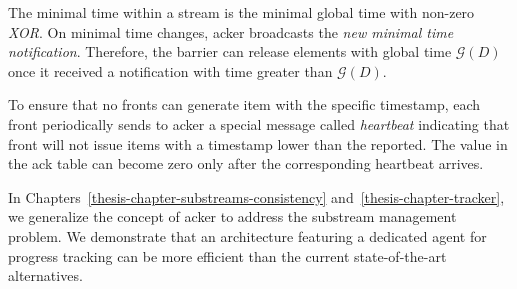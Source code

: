 The minimal time within a stream is the minimal global time with non-zero {\it XOR}. On minimal time changes, acker broadcasts the {\it new minimal time notification}. Therefore, the barrier can release elements with global time $\mathcal{G} (D)$ once it received a notification with time greater than $\mathcal{G} (D)$.

To ensure that no fronts can generate item with the specific timestamp, each front periodically sends to acker a special message called {\it heartbeat} indicating that front will not issue items with a timestamp lower than the reported. The value in the ack table can become zero only after the corresponding heartbeat arrives.

In Chapters~\ref{thesis-chapter-substreams-consistency} and~\ref{thesis-chapter-tracker}, we generalize the concept of acker to address the substream management problem. We demonstrate that an architecture featuring a dedicated agent for progress tracking can be more efficient than the current state-of-the-art alternatives.